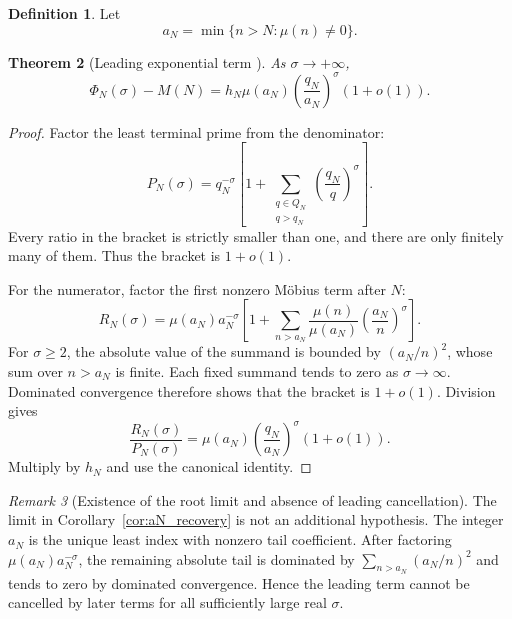 \documentclass[11pt]{amsart}
\numberwithin{equation}{section}
\theoremstyle{plain}
\newtheorem{theorem}{Theorem}[section]
\theoremstyle{definition}
\newtheorem{definition}[theorem]{Definition}
\theoremstyle{remark}
\newtheorem{remark}[theorem]{Remark}
\newcommand{\1}{\mathbf{1}}
\begin{document}
\begin{definition}
\label{def:aN}
Let
\begin{equation}
a_N
=
\min\{n>N:\mu(n)\neq0\}.
\label{eq:aN_definition}
\end{equation}
\end{definition}


\begin{theorem}[Leading exponential term {}]
\label{thm:leading_exponential}
As \(\sigma\to+\infty\),
\begin{equation}
\boxed{
\Phi_N(\sigma)-M(N)
=
h_N\mu(a_N)
\left(\frac{q_N}{a_N}\right)^\sigma
\left(1+o(1)\right).
}
\label{eq:leading_exponential}
\end{equation}
\end{theorem}

\begin{proof}
Factor the least terminal prime from the denominator:
\begin{equation}
P_N(\sigma)
=
q_N^{-\sigma}
\left[
1+
\sum_{\substack{q\in Q_N\\q>q_N}}
\left(\frac{q_N}{q}\right)^\sigma
\right].
\label{eq:leading_P_factorization}
\end{equation}
Every ratio in the bracket is strictly smaller than one, and there are only
finitely many of them.  Thus the bracket is \(1+o(1)\).

For the numerator, factor the first nonzero Möbius term after \(N\):
\begin{equation}
R_N(\sigma)
=
\mu(a_N)a_N^{-\sigma}
\left[
1+
\sum_{n>a_N}
\frac{\mu(n)}{\mu(a_N)}
\left(\frac{a_N}{n}\right)^\sigma
\right].
\label{eq:leading_R_factorization}
\end{equation}
For \(\sigma\geq2\), the absolute value of the summand is bounded by
\((a_N/n)^2\), whose sum over \(n>a_N\) is finite.  Each fixed summand
tends to zero as \(\sigma\to\infty\).  Dominated convergence therefore
shows that the bracket is \(1+o(1)\).  Division gives
\begin{equation}
\frac{R_N(\sigma)}{P_N(\sigma)}
=
\mu(a_N)
\left(\frac{q_N}{a_N}\right)^\sigma
(1+o(1)).
\label{eq:leading_ratio_detailed}
\end{equation}
Multiply by \(h_N\) and use the canonical identity.
\end{proof}

\begin{remark}[Existence of the root limit and absence of leading cancellation]
\label{rem:aN_no_cancellation}
The limit in Corollary~\ref{cor:aN_recovery} is not an additional
hypothesis.  The integer $a_N$ is the unique least index with nonzero tail
coefficient.  After factoring $\mu(a_N)a_N^{-\sigma}$, the remaining
absolute tail is dominated by $\sum_{n>a_N}(a_N/n)^2$ and tends to zero by
dominated convergence.  Hence the leading term cannot be cancelled by later
terms for all sufficiently large real $\sigma$.
\end{remark}
\end{document}

